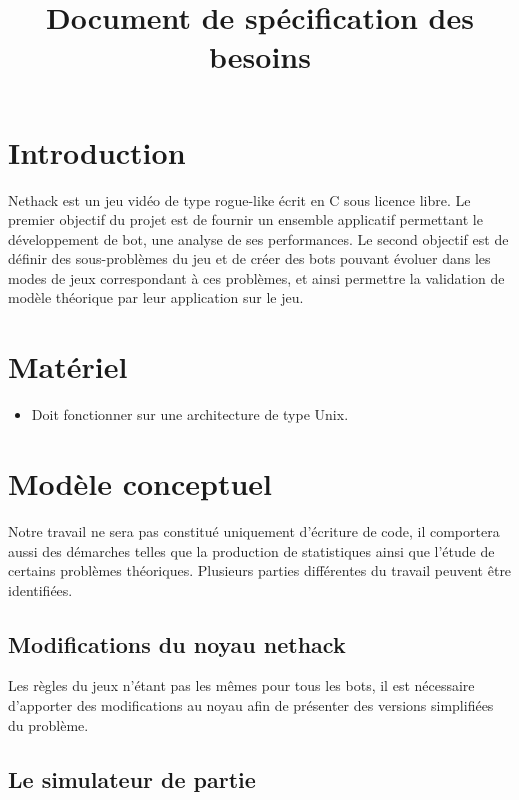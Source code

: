 \documentclass[12pt]{article}
\title{Document de spécification des besoins}
\begin{document}
\maketitle

\section{Introduction}

Nethack est un jeu vidéo de type rogue-like écrit en C sous licence
libre. Le premier objectif du projet est de fournir un ensemble
applicatif permettant le développement de bot, une analyse de ses
performances. Le second objectif est de définir des sous-problèmes du
jeu et de créer des bots pouvant évoluer dans les modes de jeux
correspondant à ces problèmes, et ainsi permettre la validation de
modèle théorique par leur application sur le jeu.

\section{Matériel}

\begin{itemize}
\item
  Doit fonctionner sur une architecture de type Unix.
\end{itemize}

\section{Modèle conceptuel}

Notre travail ne sera pas constitué uniquement d'écriture de code, il
comportera aussi des démarches telles que la production de statistiques
ainsi que l'étude de certains problèmes théoriques. Plusieurs parties
différentes du travail peuvent être identifiées.

\subsection{Modifications du noyau nethack}

Les règles du jeux n'étant pas les mêmes pour tous les bots, il est
nécessaire d'apporter des modifications au noyau afin de présenter des
versions simplifiées du problème.

\subsection{Le simulateur de partie}
\end{document}
